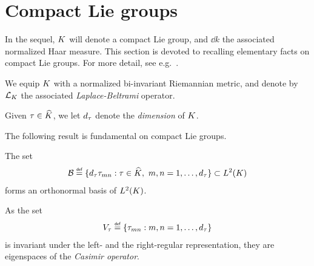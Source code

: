 %
%

\section{Compact Lie groups}

In the sequel,
$\CompactGroup$ will denote a compact Lie group,
and $\dd k$ the associated normalized Haar measure.
This section is devoted to recalling elementary facts on compact Lie groups.
For more detail, see e.g.~\cite{RuzhanskyTurunen10,Knapp02}.

We equip $\CompactGroup$ with a normalized bi-invariant Riemannian metric,
and denote by $\Laplacian [\CompactGroup]$ the associated \emph{Laplace-Beltrami} operator.

Given $\tau \in \dualGroup \CompactGroup$,
we let $\dimRep \tau$ denote the \emph{dimension} of $\CompactGroup$.

The following result is fundamental on compact Lie groups.

\begin{theorem}
\label{theorem:Peter-Weyl_theorem}
    The set
    \begin{align*}
        \mathcal B \defeq \{\dimRep \tau \tau_{m n} : \tau \in \dualGroup \CompactGroup, \ m,n = 1, \dots, \dimRep \tau \} \subset \Lebesgue 2 \CompactGroup
    \end{align*}
    forms an orthonormal basis of $\Lebesgue 2 \CompactGroup$.
\end{theorem}

As the set
\begin{align*}
    V_\tau \defeq \{\tau_{m n} : m, n = 1, \dots, \dimRep \tau\}
\end{align*}
is invariant under the left- and the right-regular representation,
they are eigenspaces of the \emph{Casimir operator}.

